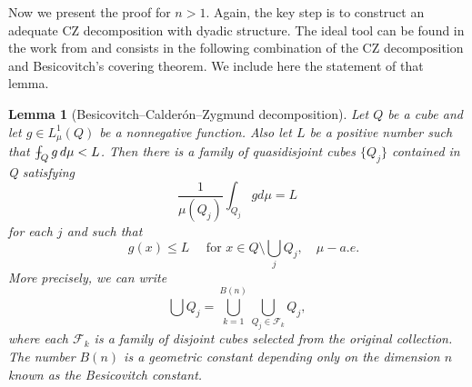 \documentclass[11pt,a4paper]{amsart}
\newtheorem{lemma}[theorem]{Lemma}
\theoremstyle{definition}
\theoremstyle{remark}
\numberwithin{equation}{section}
\def\Xint#1{\mathchoice
  {\XXint\displaystyle\textstyle{#1}}%
  {\XXint\textstyle\scriptstyle{#1}}%
  {\XXint\scriptstyle\scriptscriptstyle{#1}}%
  {\XXint\scriptscriptstyle\scriptscriptstyle{#1}}%
  \!\int}
\def\XXint#1#2#3{{\setbox0=\hbox{$#1{#2#3}{\int}$}
    \vcenter{\hbox{$#2#3$}}\kern-.5\wd0}}
\def\avgint{\Xint-}
\numberwithin{equation}{section}
\begin{document}
Now we present the proof for $n>1$. Again, the key step is to construct an adequate CZ decomposition with dyadic structure. The ideal tool can be found in the work from \cite{OP-nondoubling} and consists in the following combination of the CZ decomposition and Besicovitch's covering theorem. We include here the statement of that lemma.

\begin{lemma}[Besicovitch--Calder\'on--Zygmund decomposition]\label{lem:BCZ} Let $Q$ be a cube and let $g\in L^1_\mu(Q)$ be a nonnegative function. Also let $L$ be a positive number such that 
$\avgint_Q g\, d\mu<L$. Then there is a
family of quasidisjoint cubes $\{Q_j\}$ contained in Q satisfying
\begin{equation*}
\frac{1}{\mu\left(Q_{j}\right)} \int_{Q_{j}} g d \mu=L
\end{equation*}
for each $j$ and such that 
\begin{equation*}
\quad g(x) \leq L \quad \text{ for } x \in Q \setminus \bigcup_{j} Q_{j}, \quad \mu-a . e.
\end{equation*}
More precisely, we can write 
\begin{equation*}
\bigcup Q_j =\bigcup_{k=1}^{B(n)}\bigcup_{Q_j\in \mathcal{F}_k}Q_j,
\end{equation*}
where each $\mathcal F_k$ is a family of disjoint cubes selected from the original collection. The number $B(n)$ is a geometric constant depending only on the dimension $n$ known as the \emph{Besicovitch constant}.
\end{lemma}
\end{document}

